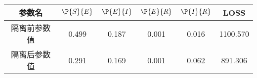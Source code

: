 \begin{tabular}{cccccc}
\hline
参数名&$\P{S}{E}$&$\P{E}{I}$&$\P{E}{R}$&$\P{I}{R}$&LOSS\\
\hline
隔离前参数值&0.499&0.187&0.001&0.016&1100.570\\
隔离后参数值&0.291&0.169&0.001&0.062&891.306\\
\hline
\end{tabular}